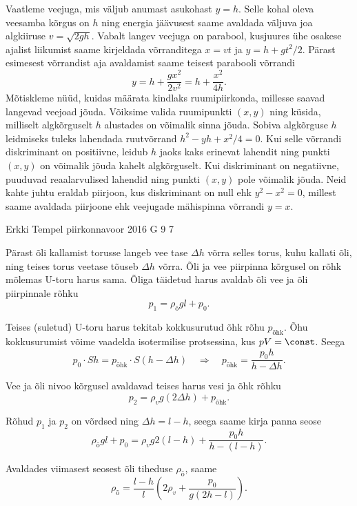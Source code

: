 \documentclass[11pt]{article}
\begin{document}
{{\ifSolution
Vaatleme veejuga, mis väljub anumast asukohast $y=h$. Selle kohal oleva veesamba kõrgus on $h$ ning energia jäävusest saame avaldada väljuva joa algkiiruse $v=\sqrt{2gh}$. Vabalt langev veejuga on parabool, kusjuures ühe osakese ajalist liikumist saame kirjeldada võrranditega $x=vt$ ja $y=h+gt^2/2$. Pärast esimesest võrrandist aja avaldamist saame teisest parabooli võrrandi
\[
y = h + \frac{gx^2}{2v^2} = h + \frac{x^2}{4h}.
\]
Mõtiskleme nüüd, kuidas määrata kindlaks ruumipiirkonda, millesse saavad langevad veejoad jõuda. Võiksime valida ruumipunkti $(x,y)$ ning küsida, milliselt algkõrguselt $h$ alustades on võimalik sinna jõuda. Sobiva algkõrguse $h$ leidmiseks tuleks lahendada ruutvõrrand $h^2 - yh + x^2/4 = 0$. Kui selle võrrandi diskriminant on positiivne, leidub $h$ jaoks kaks erinevat lahendit ning punkti $(x,y)$ on võimalik jõuda kahelt algkõrguselt. Kui diskriminant on negatiivne, puuduvad reaalarvulised lahendid ning punkti $(x,y)$ pole võimalik jõuda. Neid kahte juhtu eraldab piirjoon, kus diskriminant on null ehk $y^2 - x^2=0$, millest saame avaldada piirjoone ehk veejugade mähispinna võrrandi $y=x$.
\fi
}

{Erkki Tempel} %
{piirkonnavoor} %
{2016} %
{G 9} %
{7} %
{

\ifSolution
Pärast õli kallamist torusse langeb vee tase $\Delta h$ võrra selles torus, kuhu kallati õli, ning teises torus veetase tõuseb $\Delta h$ võrra. Õli ja vee piirpinna kõrgusel on rõhk mõlemas U-toru harus sama. Õliga täidetud harus avaldab õli vee ja õli piirpinnale rõhku
\[ p_1 = \rho_{\text{õ}}gl + p_0.\]

Teises (suletud) U-toru harus tekitab kokkusurutud õhk rõhu $p_{\text{õhk}}$. Õhu kokkusurumist võime vaadelda isotermilise protsessina, kus $pV = \const$. Seega
\[ p_0\cdot Sh = p_{\text{õhk}}\cdot S(h-\Delta h) \quad\Rightarrow\quad p_{\text{õhk}} = \frac{p_0h}{h-\Delta h}.\]

Vee ja õli nivoo kõrgusel avaldavad teises harus vesi ja õhk rõhku
\[ p_2 = \rho_vg(2\Delta h) + p_{\text{õhk}}.\]

Rõhud $p_1$ ja $p_2$ on võrdsed ning $\Delta h = l - h$, seega saame kirja panna seose
\[ \rho_{\text{õ}}gl + p_0 = \rho_vg2(l-h) + \frac{p_0h}{h-(l-h)}.\]

Avaldades viimasest seosest õli tiheduse $\rho_{\text{õ}}$, saame
\[ \rho_{\text{õ}} = \frac{l-h}{l}\left(2\rho_v+\frac{p_0}{g(2h-l)}\right).\]
\fi
}
\newpage
}
\end{document}
